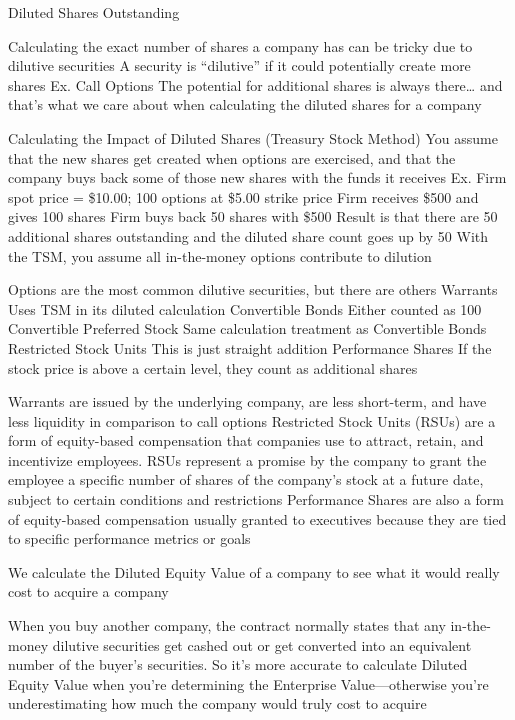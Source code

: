 \documentclass[10pt]{article}
\begin{document}
    \begin{core}{Diluted Shares Outstanding}

      Calculating the exact number of shares a company has can be tricky due to dilutive securities
      A security is “dilutive” if it could potentially create more shares
      Ex. Call Options
      The potential for additional shares is always there… and that’s what we care about when calculating the diluted shares for a company

      Calculating the Impact of Diluted Shares (Treasury Stock Method)
      You assume that the new shares get created when options are exercised, and that the company buys back some of those new shares with the funds it receives
      Ex. Firm spot price = \$10.00; 100 options at \$5.00 strike price
      Firm receives \$500 and gives 100 shares
      Firm buys back 50 shares with \$500
              Result is that there are 50 additional shares outstanding and the diluted share count goes up by 50
      With the TSM, you assume all in-the-money options contribute to dilution

      Options are the most common dilutive securities, but there are others
      Warrants
      Uses TSM in its diluted calculation
      Convertible Bonds
      Either counted as 100%
      Convertible Preferred Stock
      Same calculation treatment as Convertible Bonds
      Restricted Stock Units
      This is just straight addition
      Performance Shares
      If the stock price is above a certain level, they count as additional shares

      Warrants are issued by the underlying company, are less short-term, and have less liquidity in comparison to call options
      Restricted Stock Units (RSUs) are a form of equity-based compensation that companies use to attract, retain, and incentivize employees. RSUs represent a promise by the company to grant the employee a specific number of shares of the company’s stock at a future date, subject to certain conditions and restrictions
      Performance Shares are also a form of equity-based compensation usually granted to executives because they are tied to specific performance metrics or goals

      We calculate the Diluted Equity Value of a company to see what it would really cost to acquire a company

      When you buy another company, the contract normally states that any in-the-money dilutive securities get cashed out or get converted into an equivalent number of the buyer’s securities. So it’s more accurate to calculate Diluted Equity Value when you’re determining the Enterprise Value—otherwise you’re underestimating how much the company would truly cost to acquire

    \end{core}
\end{document}
